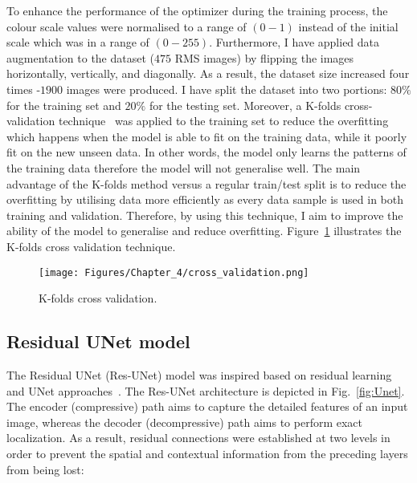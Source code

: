 To enhance the performance of the optimizer during the training process, the colour scale values were normalised to a range of \((0-1)\) instead of the initial scale which was in a range of \((0-255)\). 
Furthermore, I have applied data augmentation to the dataset (\(475\) RMS images) by flipping the images horizontally, vertically, and diagonally. 
As a result, the dataset size increased four times -\(1900\) images were produced. 
I have split the dataset into two portions: \(80\%\) for the training set and \(20\%\) for the testing set. 
Moreover, a K-folds cross-validation technique~\cite{Srinivasan2019} was applied to the training set to reduce the overfitting which happens when the model is able to fit on the training data, while it poorly fit on the new unseen data.
In other words, the model only learns the patterns of the training data therefore the model will not generalise well. 
The main advantage of the K-folds method versus a regular train/test split is to reduce the overfitting by utilising data more efficiently as every data sample is used in both training and validation. 
Therefore, by using this technique, I aim to improve the ability of the model to generalise and reduce overfitting.
Figure~\ref{fig:cross_validation} illustrates the K-folds cross validation technique.
\begin{figure} [h!]
	\begin{center}
		\texttt{[image: Figures/Chapter\_4/cross\_validation.png]}
	\end{center}
	\caption{K-folds cross validation.} 
	\label{fig:cross_validation}
\end{figure}
\subsection{Residual UNet model}
\label{sec432}
The Residual UNet (Res-UNet) model was inspired based on residual learning~\cite{He2016} and UNet approaches~\cite{Ronneberger2015}.
The Res-UNet architecture is depicted in Fig.~\ref{fig:Unet}.
The encoder (compressive) path aims to capture the detailed features of an input image, whereas the decoder (decompressive) path aims to perform exact localization.
As a result, residual connections were established at two levels in order to prevent the spatial and contextual information from the preceding layers from being lost:

